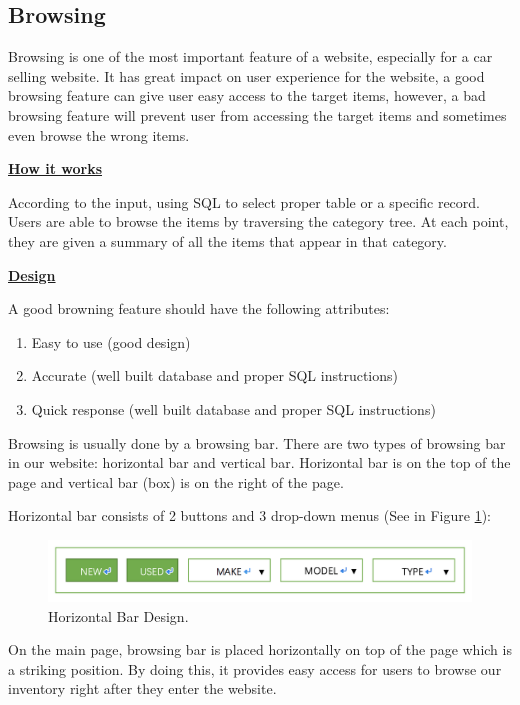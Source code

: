 \documentclass[12pt]{article}
\begin{document}
\subsection{Browsing}
Browsing is one of the most important feature of a website, especially for a car selling website. It has great impact on user experience for the website, a good browsing feature can give user easy access to the target items, however, a bad browsing feature will prevent user from accessing the target items and sometimes even browse the wrong items.\par
\textbf{\underline{How it works}}\par
According to the input, using SQL to select proper table or a specific record. Users are able to browse the items by traversing the category tree. At each point, they are given a summary of all the items that appear in that category.\par
\textbf{\underline{Design}}\par
A good browning feature should have the following attributes:\par
\begin{enumerate}
\item Easy to use (good design)
\item Accurate (well built database and proper SQL instructions)
\item Quick response (well built database and proper SQL instructions)
\end{enumerate}
\par Browsing is usually done by a browsing bar. There are two types of browsing bar in our website: horizontal bar and vertical bar. Horizontal bar is on the top of the page and vertical bar (box) is on the right of the page.\par
Horizontal bar consists of 2 buttons and 3 drop-down menus (See in Figure \ref{horBar}):
\begin{figure}[!h]
\caption{Horizontal Bar Design.} \label{horBar}
\begin{center}
\includegraphics[width=\textwidth]{horizontal_bar}
\end{center}
\end{figure}
\par On the main page, browsing bar is placed horizontally on top of the page which is a striking position. By doing this, it provides easy access for users to browse our inventory right after they enter the website.\par
\end{document}
